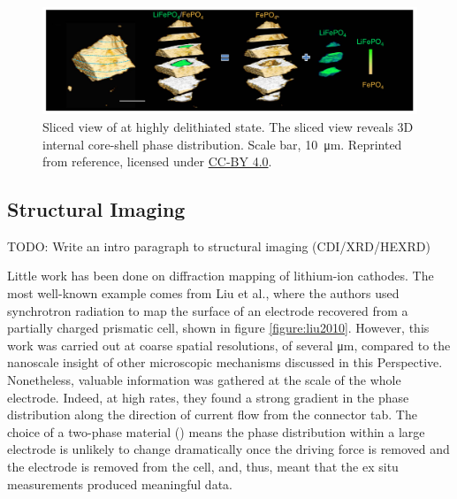 \documentclass[journal=cmatex,manuscript=perspective]{achemso}
\begin{document}
\begin{figure}
  \includegraphics[width=\textwidth]{wang2016.png}
  \caption{Sliced view of  at highly delithiated
    state. The sliced view reveals 3D internal core-shell phase
    distribution. Scale bar, \SI{10}{\micro\metre}. Reprinted from
    reference\cite{wang2016}, licensed under
    \href{https://creativecommons.org/licenses/by/4.0/}{CC-BY 4.0}.}
  \label{figure:wang2016}
\end{figure}


\subsection{Structural Imaging}
TODO: Write an intro paragraph to structural imaging (CDI/XRD/HEXRD)

Little work has been done on diffraction mapping of lithium-ion
cathodes. The most well-known example comes from Liu et
al.\cite{liu2010}, where the authors used synchrotron radiation to map
the surface of an electrode recovered from a partially charged
prismatic cell, shown in figure \ref{figure:liu2010}. However, this
work was carried out at coarse spatial resolutions, of several
\si{\micro\meter}, compared to the nanoscale insight of other
microscopic mechanisms discussed in this Perspective. Nonetheless,
valuable information was gathered at the scale of the whole
electrode. Indeed, at high rates, they found a strong gradient in the
phase distribution along the direction of current flow from the
connector tab. The choice of a two-phase material () means
the phase distribution within a large electrode is unlikely to change
dramatically once the driving force is removed and the electrode is
removed from the cell, and, thus, meant that the ex situ measurements
produced meaningful data.
\end{document}
